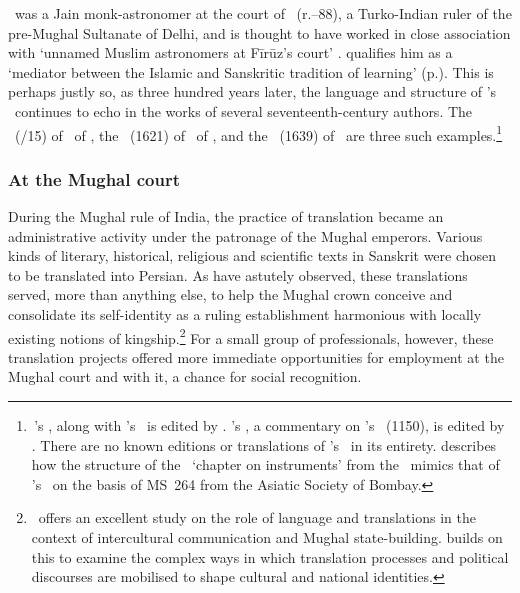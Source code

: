 \MahendraSuri\ was a Jain monk-astronomer at the court of \FiruzShah\ (r.--88), a Turko-Indian ruler of the pre-Mughal Sultanate of Delhi, and is thought to have worked in close association with `unnamed Muslim astronomers at Fīrūz's court' \parencite[148]{SarmaAstrolabeinSanskrit}. \citeauthor{SarmaAstrolabeinSanskrit} qualifies him as a `mediator between the Islamic and Sanskritic tradition of learning' (p.). This is perhaps justly so, as three hundred years later,  the language and structure of \MahendraSuri's \Yantraraja\ continues to echo in the works of several seventeenth-century authors. The \Yantrasiromani\ (/15) of \Visrama\ of \Jambusara, the \Vasanavarttika\ (1621) of \NrsimhaDaivajna\ of \Kashi, and the \Sarvasiddhantaraja\ (1639) of \Nityananda\ are three such examples.\footnote{\,\MahendraSuri's \Yantraraja, along with \Visrama's \Yantrasiromani\ is edited by \textcite{Raikva}. \NrsimhaDaivajna's \Vasanavarttika, a commentary on \BhaskaraII's \Siddhantasiromani\ (1150), is edited by \textcite{Chaturvedi}. There are no known editions or translations of \Nityananda's \Sarvasiddhantaraja\ in its entirety. \textcite[149]{SarmaAstrolabeinSanskrit} describes how the structure of the \yantradhyaya\ `chapter on instruments' from the \Sarvasiddhantaraja\ mimics that of \MahendraSuri's \Yantraraja\ on the basis of MS~264 from the Asiatic Society of Bombay.} 


\subsubsection{At the Mughal court} \label{Mughal_court}
During the Mughal rule of India, the practice of translation became an administrative activity under the patronage of the Mughal emperors. Various kinds of literary, historical, religious and scientific texts in Sanskrit were chosen to be translated into Persian. As \textcites{AlamSubramanyam, Truschke} have astutely observed, these translations served, more than anything else, to help the Mughal crown conceive and consolidate its self-identity as a ruling establishment harmonious with locally existing notions of kingship.\footnote{\,\textcite{Haider} offers an excellent study on the role of language and translations in the context of intercultural communication and Mughal state-building. \textcite{Israel} builds on this to examine the complex ways in which translation processes and political discourses are mobilised to shape cultural and national identities.} %
For a small group of professionals, however, these translation projects offered more immediate opportunities for employment at the Mughal court and with it, a chance for social recognition.

